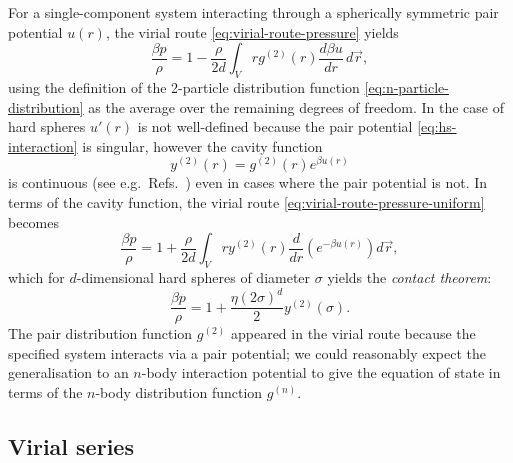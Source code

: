 \vspace{0.5em}
\begin{tcolorbox}[title=Contact theorem for hard spheres]
  For a single-component system interacting through a spherically symmetric pair potential $u(r)$, the virial route \eqref{eq:virial-route-pressure} yields
  \begin{equation}\label{eq:virial-route-pressure-uniform}
    \frac{\beta p}{\rho}
    =
    1
    -
    \frac{\rho}{2 d}
    \int_V
    r g^{(2)}(r) \frac{d \beta u}{d r} \, d\vec{r},
  \end{equation}
  using the definition of the 2-particle distribution function \eqref{eq:n-particle-distribution} as the average over the remaining degrees of freedom.
  In the case of hard spheres $u'(r)$ is not well-defined because the pair potential \eqref{eq:hs-interaction} is singular, however the cavity function
  \begin{equation*}\label{eq:cavity-function}
    y^{(2)}(r) = g^{(2)}(r) e^{\beta u(r)}
  \end{equation*}
  is continuous (see e.g.\ Refs.\ \cite{Hansen2013,Santos2016}) even in cases where the pair potential is not.
  In terms of the cavity function, the virial route \eqref{eq:virial-route-pressure-uniform} becomes
  \begin{equation*}\label{eq:virial-route-pressure-cavity}
    \frac{\beta p}{\rho}
    =
    1
    +
    \frac{\rho}{2 d}
    \int_V
    r y^{(2)}(r) \frac{d}{dr} \left( e^{-\beta u(r)} \right)
    d\vec{r},
  \end{equation*}
  which for $d$-dimensional hard spheres of diameter $\sigma$ yields the \emph{contact theorem}:
  \begin{equation}\label{eq:contact-theorem}
    \frac{\beta p}{\rho}
    =
    1
    +
    \frac{\eta (2\sigma)^d}{2}
    y^{(2)}(\sigma).
  \end{equation}
  The pair distribution function $g^{(2)}$ appeared in the virial route because the specified system interacts via a pair potential; we could reasonably expect the generalisation to an $n$-body interaction potential to give the equation of state in terms of the $n$-body distribution function $g^{(n)}$.
\end{tcolorbox}

\subsection{Virial series}
\label{sec:virial-series}

